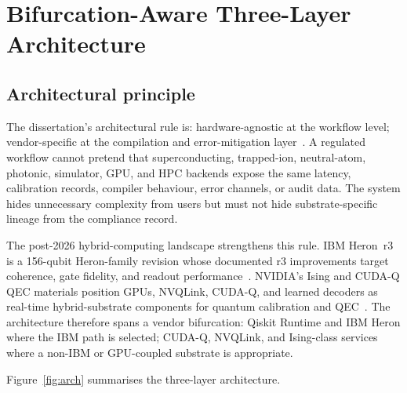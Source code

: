 \documentclass[11pt,letterpaper]{article}
\begin{document}
\section{Bifurcation-Aware Three-Layer Architecture}

\subsection{Architectural principle}

The dissertation's architectural rule is: hardware-agnostic at the workflow level;
vendor-specific at the compilation and error-mitigation layer~\cite{cohen2026proposal}.
A regulated workflow cannot pretend that superconducting, trapped-ion, neutral-atom, photonic,
simulator, GPU, and HPC backends expose the same latency, calibration records, compiler
behaviour, error channels, or audit data.  The system hides unnecessary complexity from users
but must not hide substrate-specific lineage from the compliance record.

The post-2026 hybrid-computing landscape strengthens this rule.  IBM Heron~r3 is a 156-qubit
Heron-family revision whose documented r3 improvements target coherence, gate fidelity, and
readout performance~\cite{heron2026ibm}.  NVIDIA's Ising and CUDA-Q QEC materials position
GPUs, NVQLink, CUDA-Q, and learned decoders as real-time hybrid-substrate components for
quantum calibration and QEC~\cite{ising2026nvidia,cudaqec2026}.  The architecture therefore
spans a vendor bifurcation: Qiskit Runtime and IBM Heron where the IBM path is selected;
CUDA-Q, NVQLink, and Ising-class services where a non-IBM or GPU-coupled substrate is
appropriate.

Figure~\ref{fig:arch} summarises the three-layer architecture.
\end{document}
